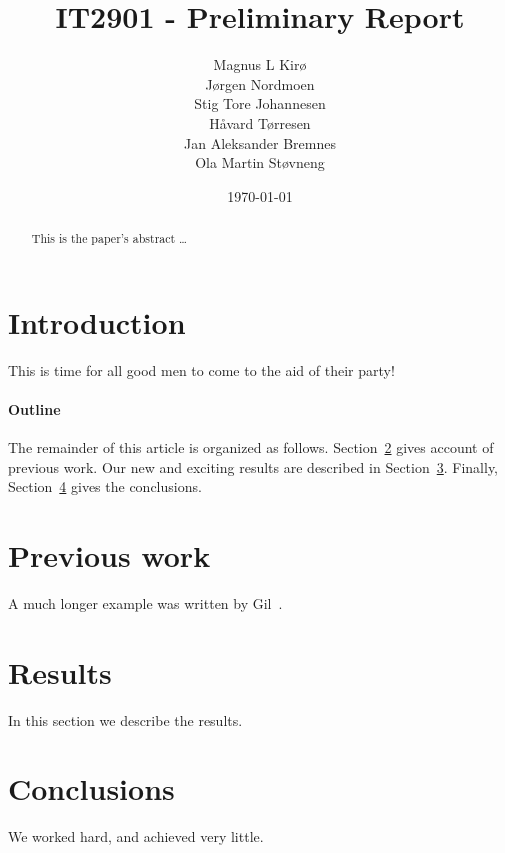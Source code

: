 \documentclass[12pt]{article}
\title{IT2901 - Preliminary Report}
\author{
        Magnus L Kirø \\
        Jørgen Nordmoen \\
        Stig Tore Johannesen \\
        Håvard Tørresen \\
        Jan Aleksander Bremnes \\
        Ola Martin Støvneng 
}
\date{\today}
\begin{document}
\maketitle
{}

\begin{abstract}
This is the paper's abstract \ldots
\end{abstract}

\section{Introduction}
This is time for all good men to come to the aid of their party!

\paragraph{Outline}
The remainder of this article is organized as follows.
Section~\ref{previous work} gives account of previous work.
Our new and exciting results are described in Section~\ref{results}.
Finally, Section~\ref{conclusions} gives the conclusions.

\section{Previous work}\label{previous work}
A much longer \LaTeXe{} example was written by Gil~\cite{Gil:02}.

\section{Results}\label{results}
In this section we describe the results.

\section{Conclusions}\label{conclusions}
We worked hard, and achieved very little.



\end{document}
